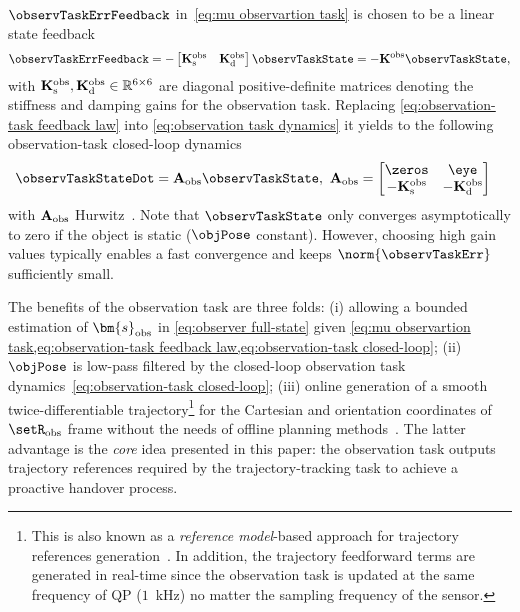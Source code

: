  $\observTaskErrFeedback$ in~\eqref{eq:mu observartion task} is chosen to be a linear state feedback 
	\begin{equation}\label{eq:observation-task feedback law}
		\observTaskErrFeedback = - \begin{bmatrix}
			\mathbf{K}_{\rm s}^{\rm obs} & \mathbf{K}_{\rm d}^{\rm obs} 
		\end{bmatrix}\observTaskState = -\mathbf{K}^{\rm obs}\observTaskState,
	\end{equation}
	with $\mathbf{K}_{\rm s}^{\rm obs}, \mathbf{K}_{\rm d}^{\rm obs} \in \mathbb{R}^{6\times6}$ are diagonal positive-definite matrices denoting the stiffness and damping gains for the observation task. Replacing \cref{eq:observation-task feedback law} into \cref{eq:observation task dynamics} it yields to the following observation-task closed-loop dynamics
	\begin{align}
		\label{eq:observation-task closed-loop}\observTaskStateDot &= \mathbf{A}_{\rm obs}\observTaskState, \ \mathbf{A}_{\rm obs} = 
		\begin{bmatrix}
			\zeros & \eye \\ -\mathbf{K}_{\rm s}^{\rm obs} & -\mathbf{K}_{\rm d}^{\rm obs}
		\end{bmatrix}
	\end{align}
	with $\mathbf{A}_{\rm obs}$ Hurwitz~\cite{khalil2002NonLinearSystems}. Note that $\observTaskState$ only converges asymptotically to zero if the object is static ($\objPose$ constant). However, choosing high gain values typically enables a fast convergence and keeps $\norm{\observTaskErr}$ sufficiently small. 
	
	The benefits of the observation task are three folds: (i) allowing a bounded estimation of $\bm{s}_{\rm obs}$ in \cref{eq:observer full-state} given \cref{eq:mu observartion task,eq:observation-task feedback law,eq:observation-task closed-loop}; (ii) $\objPose$ is low-pass filtered by the closed-loop observation task dynamics~\eqref{eq:observation-task closed-loop}; (iii)  online generation of a smooth twice-differentiable trajectory\footnote{This is also known as a \emph{reference model}-based approach for trajectory references generation~\cite[Chapter 13]{khalil2002NonLinearSystems}. In addition, the trajectory feedforward terms are generated in real-time since the observation task is updated at the same frequency of QP ($1$~kHz) no matter the sampling frequency of the sensor.} for the Cartesian and orientation coordinates of $\setR_{\rm obs}$ frame without the needs of offline planning methods~\cite{sciavicco2000book}. The latter advantage is the \emph{core} idea presented in this paper: the observation task outputs trajectory references required by the trajectory-tracking task to achieve a proactive handover process. 
	
